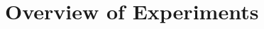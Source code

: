 \documentclass[floatsintext,doc]{apa6}
\begin{document}







\hypertarget{overview-of-experiments}{%
\section{Overview of Experiments}\label{overview-of-experiments}}
\end{document}
